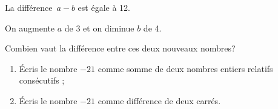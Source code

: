 \begin{exercice}
La différence $a - b$ est égale à 12.

On augmente $a$ de 3 et on diminue $b$ de 4.

Combien vaut la différence entre ces deux nouveaux nombres? 
\end{exercice}


\begin{exercice}[Le nombre $-21$...]
\begin{enumerate}
 \item Écris le nombre $-21$ comme somme de deux nombres entiers relatifs consécutifs ;
 \item Écris le nombre $-21$ comme différence de deux carrés.
 \end{enumerate}
\end{exercice}


